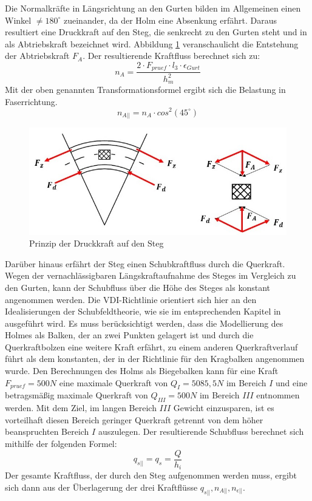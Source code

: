 \noindent Die Normalkräfte in Längsrichtung an den Gurten bilden im Allgemeinen einen Winkel $ \neq180^{\circ} $ zueinander, da der Holm eine Absenkung erfährt. Daraus resultiert eine Druckkraft auf den Steg, die senkrecht zu den Gurten steht und in \cite{item5} als Abtriebskraft bezeichnet wird. Abbildung \ref{fig: Abtriebskraft} veranschaulicht die Entstehung der Abtriebskraft $ F_{A} $. Der resultierende Kraftfluss berechnet sich zu:
\begin{equation}\label{na}
	n_{A}=\frac{2\cdot F_{pruef}\cdot l_{3}\cdot\epsilon_{Gurt}}{h_{m}^{2}}
\end{equation}
 Mit der oben genannten Transformationsformel ergibt sich die Belastung in Faserrichtung.
 \begin{equation}
 	n_{A||}=n_{A}\cdot cos^{2}\left(45^{\circ} \right)
 \end{equation} 

\begin{figure}[h]
	\includegraphics[width=1.0\textwidth]{Bilder/Abtriebskraft.jpg}
	\caption{Prinzip der Druckkraft auf den Steg}
	\label{fig: Abtriebskraft}
\end{figure}
\noindent Darüber hinaus erfährt der Steg einen Schubkraftfluss durch die Querkraft. Wegen der vernachlässigbaren Längskraftaufnahme des Steges im Vergleich zu den Gurten, kann der Schubfluss über die Höhe des Steges als konstant angenommen werden. Die VDI-Richtlinie orientiert sich hier an den Idealisierungen der Schubfeldtheorie, wie sie im entsprechenden Kapitel in \cite{item15} ausgeführt wird. Es muss berücksichtigt werden, dass die Modellierung des Holmes als Balken, der an zwei Punkten gelagert ist und durch die Querkraftbolzen eine weitere Kraft erfährt, zu einem anderen Querkraftverlauf führt als dem konstanten, der in der Richtlinie für den Kragbalken angenommen wurde. Den Berechnungen des Holms als Biegebalken kann für eine Kraft $ F_{pruef}=500N $ eine maximale Querkraft von $ Q_{I}=5085,5N $ im Bereich $ I $ und eine betragsmäßig maximale Querkraft von $Q_{III}=500N $ im Bereich $ III $ entnommen werden. Mit dem Ziel, im langen Bereich $ III $ Gewicht einzusparen, ist es vorteilhaft diesen Bereich geringer Querkraft getrennt von dem höher beanspruchten Bereich $ I $ auszulegen. Der resultierende Schubfluss berechnet sich mithilfe der folgenden Formel:\\
\begin{equation}\label{qs}
	q_{s||}=q_{s}=\frac{Q}{h_{i}} 
\end{equation}
Der gesamte Kraftfluss, der durch den Steg aufgenommen werden muss, ergibt sich dann aus der Überlagerung der drei Kraftflüsse $q_{s||}, n_{A||}, n_{\epsilon||} $. 

